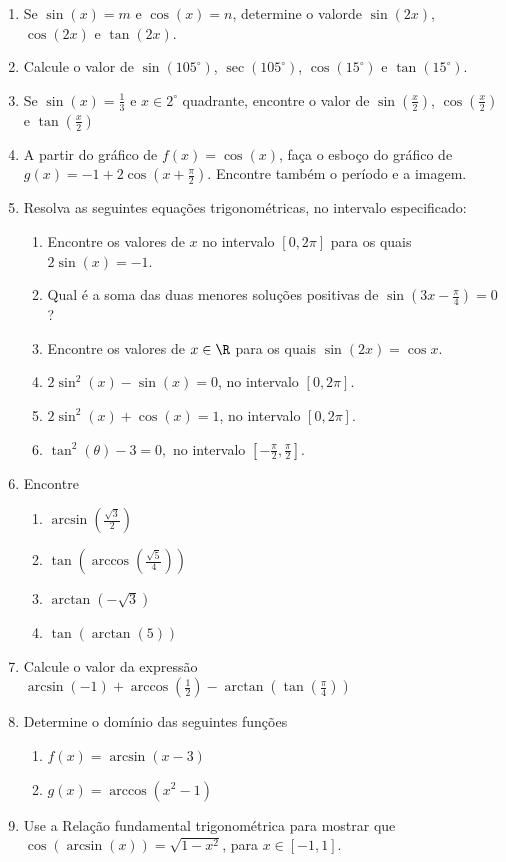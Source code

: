 \begin{enumerate}
  \[\frac{\sin(\frac{\pi}{2}-x)\sin(\pi-x)}{\cos(\pi-x)\cos(2\pi-x)}\]
\item Se $\sin(x) = m$ e $\cos(x) = n$, determine o valorde $\sin(2x)$, $\cos(2x)$ e $\tan(2x)$.
\item Calcule o valor de $\sin(105^{\circ})$, $\sec(105^{\circ})$, $\cos(15^{\circ})$ e $\tan(15^{\circ})$.
\item Se $\sin(x)= \frac{1}{3}$ e $x \in 2^{\circ}$ quadrante, encontre o valor de $\sin(\frac{x}{2})$, $\cos(\frac{x}{2})$ e $\tan(\frac{x}{2})$
\item A partir do gráfico de $f(x)= \cos(x)$, faça o esboço do gráfico de $g(x)=-1+ 2 \cos(x+ \frac{\pi}{2})$. Encontre também o período e a imagem.


\item Resolva as seguintes equações trigonométricas, no intervalo especificado:
\begin{enumerate}
 \item Encontre os valores de $x$ no intervalo $[0,2\pi]$ para os quais $2\sin(x)=-1$.
 \item Qual é a soma das duas menores soluções positivas de $\sin\left(3x-\frac{\pi}{4}\right)=0$?
 \item Encontre os valores de $x\in\R$ para os quais $\sin(2x)=\cos x$.
 \item $2 \sin^2(x)- \sin(x)=0$, no intervalo $[0,2\pi]$.
 \item $2\sin^2(x)+\cos(x)=1$, no intervalo $[0,2\pi]$.
 \item $\tan^2(\theta) -3 = 0,$ no intervalo $[-\frac{\pi}{2},\frac{\pi}{2}]$.
\end{enumerate}
\item Encontre
\begin{enumerate}
    \item $\arcsin(\frac{\sqrt{3}}{2})$
    \item $\tan(\arccos(\frac{\sqrt{5}}{4}))$
    \item $\arctan(-\sqrt{3})$
    \item $\tan(\arctan(5))$
\end{enumerate}
\item Calcule o valor da expressão $\arcsin(-1)+\arccos(\frac{1}{2})-\arctan(\tan(\frac{\pi}{4}))$
\item Determine o domínio das seguintes funções
\begin{enumerate}
    \item $f(x)=\arcsin(x-3)$
    \item $g(x)=\arccos(x^2-1)$
\end{enumerate}
\item Use a Relação fundamental trigonométrica para mostrar que $\cos(\arcsin(x))=\sqrt{1-x^2}$, para $x \in [-1,1]$.
\end{enumerate}

